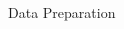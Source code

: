 \documentclass{beamer}
\begin{document}
\begin{frame}{Data Preparation}
\begin{columns}
\begin{column}{.66\textwidth}

    
\end{column}%
\end{columns}
\end{frame}
\end{document}
